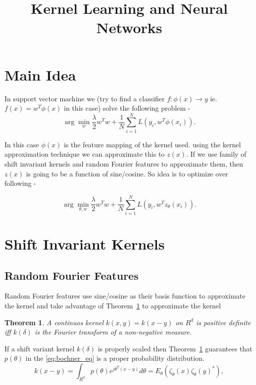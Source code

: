 \documentclass[]{article}
\newtheorem{thm}{Theorem}
\begin{document}
\title{Kernel Learning and Neural Networks}
\author{}
\maketitle

\section{Main Idea}

In support vector machine we (try to find a classifier $ f: \phi(x) \rightarrow y $ ie. $f(x) = w^T\phi(x)  $ in this case) solve the following problem - 
\begin{equation}
 \arg \min_{w} \frac{\lambda}{2} w^Tw + \frac{1}{N} \sum_{i = 1}^N L(y_i, w^T\phi(x_i) ). 
 \end{equation}

In this case $ \phi(x)$ is the feature mapping of the kernel used. using the kernel approximation technique we can approximate this to $z(x)$. If we use family of shift invariant kernels and random Fourier features to approximate them, then $ z(x)$  is going to be a function of sine/cosine. So idea is to optimize over following - 

\begin{equation}
	\label{eq:proposed_opt}
 \arg \min_{\theta, w} \frac{\lambda}{2} w^Tw + \frac{1}{N} \sum_{i = 1}^N L(y_i, w^Tz_{\theta}(x_i) ). 
 \end{equation}

\section{Shift Invariant Kernels}
\subsection{Random Fourier Features}
Random Fourier features use sine/cosine as their basis function to approximate the kernel and take advantage of  Theorem~\ref{thm:bochner} to approximate the kernel
\begin{thm}
    \label{thm:bochner}
    A continuos kernel $k(x,y) = k(x-y)$ on $R^d$ is positive definite iff $k(\delta)$ is the Fourier transform of a non-negative measure.
\end{thm}

If a shift variant kernel $k(\delta)$ is properly scaled then Theorem~\ref{thm:bochner} guarantees that $p(\theta)$ in the  \ref{eq:bochner_eq} is a proper probability distribution. 
    \begin{equation}
        \label{eq:bochner_eq}
       k(x-y) = \int_{R^d} p(\theta)e^{j\theta^T(x-y)}d\theta = E_{\theta}(\zeta_{\theta}(x)\zeta_{\theta}(y)^*),
    \end{equation}
\end{document}
